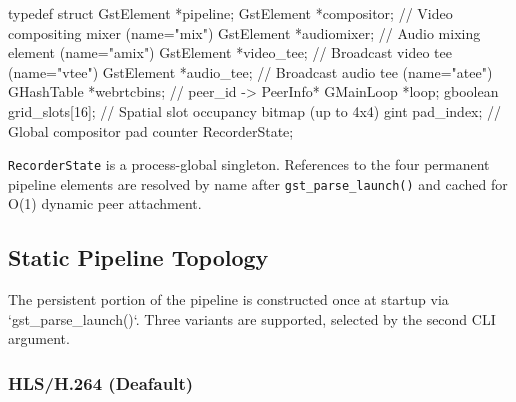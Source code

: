 \documentclass{article}
\let\originalfootnotesize\footnotesize
\let\oldverbatim\verbatim
\let\oldendverbatim\endverbatim
\renewenvironment{verbatim}{\originalfootnotesize\oldverbatim}{\oldendverbatim}
\begin{document}
\begin{verbatim}
typedef struct {
    GstElement  *pipeline;
    GstElement  *compositor;     // Video compositing mixer (name="mix")
    GstElement  *audiomixer;     // Audio mixing element (name="amix")
    GstElement  *video_tee;      // Broadcast video tee (name="vtee")
    GstElement  *audio_tee;      // Broadcast audio tee (name="atee")
    GHashTable  *webrtcbins;     // peer_id -> PeerInfo*
    GMainLoop   *loop;
    gboolean     grid_slots[16]; // Spatial slot occupancy bitmap (up to 4x4)
    gint         pad_index;      // Global compositor pad counter
} RecorderState;
\end{verbatim}

\texttt{RecorderState} is a process-global singleton. References to the four permanent
pipeline elements are resolved by name after \texttt{gst\_parse\_launch()} and cached
for O(1) dynamic peer attachment.

\subsection{Static Pipeline Topology}

The persistent portion of the pipeline is constructed once at startup via
`gst\_parse\_launch()`. Three variants are supported, selected by the second CLI argument.

\subsubsection{HLS/H.264 (Deafault)}
\end{document}
